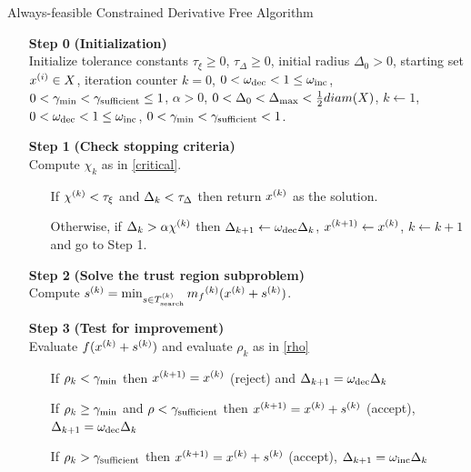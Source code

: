 \begin{algorithm}[H]
    \caption{Always-feasible Constrained Derivative Free Algorithm}
    \label{constrained_dfo}
    \begin{itemize}
        \item[\textbf{Step 0}] \textbf{(Initialization)} \\
            Initialize tolerance constants 
            $\tau_{\xi} \ge 0$,
            $\tau_{\Delta} \ge 0$,
            initial radius $\Delta_0 > 0$,
            starting set $x^{(i)} \in X$,
            iteration counter $k=0$,
            $0 < \omega_{\text{dec}} < 1 \le \omega_{\text{inc}}$,
            $0 < \gamma_{\text{min}} < \gamma_{\text{sufficient}} \le 1$,
            $\alpha > 0$,
            $0 < \Delta_0 < \Delta_{\text{max}} < \frac 1 2 diam(X)$,
            $k \gets 1$,
            $0 < \omega_{\text{dec}} < 1 \le \omega_{\text{inc}}$,
            $0 < \gamma_{\text{min}} < \gamma_{\text{sufficient}} < 1$.
        
        \item[\textbf{Step 1}] \textbf{(Check stopping criteria)} \\
            Compute $\chi_k$ as in \cref{critical}. \begin{itemize}
                \item[] If $ {\chi^{(k)}} < \tau_{\xi} $ and $\Delta_k <\tau_{\Delta}$ then return ${x}^{(k)}$ as the solution.
                \item[] Otherwise, if $\Delta_k > \alpha {\chi^{(k)}}$ then 
                $\Delta_{k+1} \gets \omega_{\text{dec}}\Delta_{k}$, 
                $x^{(k+1)} \gets {x}^{(k)}$,
                $k \gets k+1$ and go to Step 1.
            \end{itemize}
        
        \item[\textbf{Step 2}] \textbf{(Solve the trust region subproblem)} \\
            Compute ${{s}^{(k)}} = \min_{s \in {T_{\text{search}}^{(k)}}} {{m}_f}^{(k)}({x}^{(k)} + {{s}^{(k)}})$.
            
        \item[\textbf{Step 3}] \textbf{(Test for improvement)} \\
            Evaluate $f({x}^{(k)} + {{s}^{(k)}})$ and evaluate $\rho_k$ as in \cref{rho} \begin{itemize}
                \item[] If $\rho_k < \gamma_{\text{min}}$ then ${x}^{(k+1)}={x}^{(k)}$ (reject) and $\Delta_{k+1} = \omega_{\text{dec}}\Delta_{k}$
                \item[] If $\rho_k \ge \gamma_{\text{min}}$ and $\rho < \gamma_{\text{sufficient}}$ then ${x}^{(k+1)}={x}^{(k)}+{{s}^{(k)}}$ (accept), $\Delta_{k+1} = \omega_{\text{dec}}\Delta_{k}$
                \item[] If $\rho_k > \gamma_{\text{sufficient}}$ then ${x}^{(k+1)}={x}^{(k)}+{{s}^{(k)}}$ (accept), $\Delta_{k+1} = \omega_{\text{inc}}\Delta_{k}$
            \end{itemize}
            

\end{itemize}
\end{algorithm}
